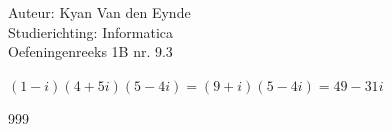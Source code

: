 \documentclass[a4paper]{article}
\begin{document}
  
\noindent \large Auteur: Kyan Van den Eynde \\
\noindent \large Studierichting: Informatica\\
\noindent \large Oefeningenreeks 1B nr. 9.3\\

\medskip

\normalsize

$(1-i)(4+5i)(5-4i) = (9+i)(5-4i) = 49-31i$\\

\begin{thebibliography}{999}
\end{thebibliography}
\end{document}
